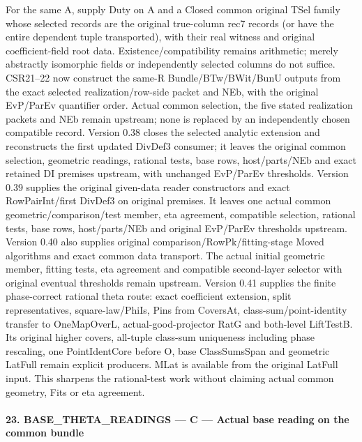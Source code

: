 \documentclass[11pt,a4paper]{article}
\numberwithin{equation}{section}
\theoremstyle{remark}\newtheorem{remark}[theorem]{Remark}
\begin{document}
For the same A, supply Duty on A and a Closed common original TSel family whose selected records are the original true-column rec7 records (or have the entire dependent tuple transported), with their real witness and original coefficient-field root data. Existence/compatibility remains arithmetic; merely abstractly isomorphic fields or independently selected columns do not suffice. CSR21–22 now construct the same-R Bundle/BTw/BWit/BunU outputs from the exact selected realization/row-side packet and NEb, with the original EvP/ParEv quantifier order. Actual common selection, the five stated realization packets and NEb remain upstream; none is replaced by an independently chosen compatible record. Version 0.38 closes the selected analytic extension and reconstructs the first updated DivDef3 consumer; it leaves the original common selection, geometric readings, rational tests, base rows, host/parts/NEb and exact retained DI premises upstream, with unchanged EvP/ParEv thresholds. Version 0.39 supplies the original given-data reader constructors and exact RowPairInt/first DivDef3 on original premises. It leaves one actual common geometric/comparison/test member, eta agreement, compatible selection, rational tests, base rows, host/parts/NEb and original EvP/ParEv thresholds upstream. Version 0.40 also supplies original comparison/RowPk/fitting-stage Moved algorithms and exact common data transport. The actual initial geometric member, fitting tests, eta agreement and compatible second-layer selector with original eventual thresholds remain upstream. Version 0.41 supplies the finite phase-correct rational theta route: exact coefficient extension, split representatives, square-law/PhiIs, Pins from CoversAt, class-sum/point-identity transfer to OneMapOverL, actual-good-projector RatG and both-level LiftTestB. Its original higher covers, all-tuple class-sum uniqueness including phase rescaling, one PointIdentCore before O, base ClassSumsSpan and geometric LatFull remain explicit producers. MLat is available from the original LatFull input. This sharpens the rational-test work without claiming actual common geometry, Fits or eta agreement.



\paragraph{23. BASE\_\allowbreak THETA\_\allowbreak READINGS — C — Actual base reading on the common bundle}
\end{document}
